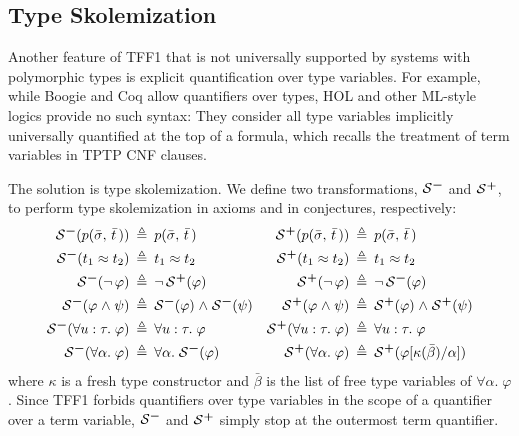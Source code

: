\subsection{Type Skolemization} \label{ssec:skol}

Another feature of TFF1 that is not universally supported
by systems with polymorphic types is explicit
quantification over type variables.
For example, while Boogie \cite{leino-ruemmer-2010} and Coq \cite{bertot-casteran-2004}
allow quantifiers over types, %
HOL and other ML-style logics provide no such syntax:
They consider all type variables
implicitly universally quantified at the top of a formula, which
recalls the treatment of term variables in TPTP CNF clauses.

The solution is type skolemization.
%
We define two transformations, $\SKOM$ and $\mathcal{S}\text{\textsuperscript{\kern.1ex\bfseries+}}$, to perform type
skolemization in axioms and in conjectures, respectively:
%
\begin{align*}
\SKOM(p(\bar{\sigma},\,\bar{t}\,)) &\eqdef p(\bar{\sigma},\,\bar{t}\,) &
\SKOP(p(\bar{\sigma},\,\bar{t}\,)) &\eqdef p(\bar{\sigma},\,\bar{t}\,) \\
\SKOM(t_1 \eq t_2) &\eqdef t_1 \eq t_2 &
\SKOP(t_1 \eq t_2) &\eqdef t_1 \eq t_2 \\
\SKOM(\lnot\, \varphi) &\eqdef \lnot\, \SKOP(\varphi) &
\SKOP(\lnot\, \varphi) &\eqdef \lnot\, \SKOM(\varphi) \\
\SKOM(\varphi \rand \psi) &\eqdef \SKOM(\varphi) \rand \SKOM(\psi) &
\SKOP(\varphi \rand \psi) &\eqdef \SKOP(\varphi) \rand \SKOP(\psi) \\
\SKOM(\forall u \ty \tau .\; \varphi) &\eqdef \forall u \ty \tau .\; \varphi &
\SKOP(\forall u \ty \tau .\; \varphi) &\eqdef \forall u \ty \tau .\; \varphi \\
\SKOM(\forall \alpha .\; \varphi) &\eqdef \forall \alpha .\; \SKOM(\varphi) &
\SKOP(\forall \alpha .\; \varphi) &\eqdef
\SKOP(\varphi[\kappa(\bar\beta)/\alpha])
\end{align*}
where $\kappa$ is a fresh type constructor and $\bar\beta$ is the list of free
type variables of $\forall \alpha .\; \varphi$.
Since TFF1 forbids quantifiers over type variables in the scope
of a quantifier over a term variable,
$\SKOM$ and $\mathcal{S}\text{\textsuperscript{\kern.1ex\bfseries+}}$ simply stop at the outermost term quantifier.


